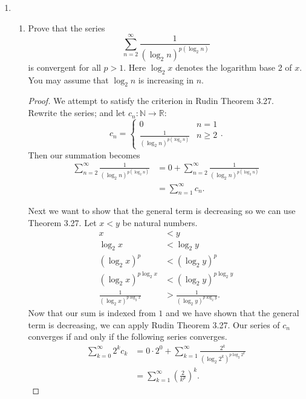\documentclass{article}
\begin{document}
\begin{enumerate} 
\item \begin{enumerate}
        \item Prove that the series $$\sum_{n=2}^\infty\frac1{(\log_2n)^{p(\log_2n)}}$$
        is convergent for all $p>1.$ Here $\log_2x$ denotes the logarithm base 2 of $x.$ You may assume
        that $\log_2n$ is increasing in $n.$

        \begin{proof} 
            We attempt to satisfy the criterion in Rudin Theorem 3.27. Rewrite the series; 
            and let $c_n:\mathbb{N}\to \mathbb{R}$:
            \[
            c_n=\begin{cases}
                0&n=1\\
                \frac1{(\log_2n)^{p(\log_2n)}}&n\ge 2
            \end{cases}
            .\] 
            Then our summation becomes
            \begin{align*}
                \sum_{n=2}^\infty\frac1{(\log_2n)^{p(\log_2n)}}&= 0+\sum_{n=2}^\infty\frac1{(\log_2n)^{p(\log_2n)}} \\
                &= \sum_{n=1}^{\infty} c_n
            .\end{align*}

            Next we want to show that the general term is decreasing so we can use Theorem 3.27. Let $x<y$
            be natural numbers.
            \begin{align*}
                x&<y\\
                \log_2 x&<\log_2 y\\
                (\log_2 x)^{p}&<(\log_2 y)^{p}\\
                (\log_2 x)^{p\log_2 x}&<(\log_2 y)^{p\log_2 y}\\
                \frac{1}{(\log_2 x)^{p\log_2 x}}&>\frac{1}{(\log_2 y)^{p\log_2 y}}
            .\end{align*}
            Now that our sum is indexed from $1$ and we have shown that the general term is decreasing,
            we can apply Rudin Theorem 3.27. Our series of $c_n$ converges if and only if the following 
            series converges.
            \begin{align*}
                \sum_{k=0}^{\infty} 2^kc_k
                &= 0\cdot 2^0+  \sum_{k=1}^{\infty} \frac{2^k}{\left(\log_2 2^k\right)^{p\log_2 2^k}} \\
                &= \sum_{k=1}^{\infty} \left( \frac{2}{k^{p}} \right) ^{k} 
            .\end{align*}   


\end{proof}
\end{enumerate}
\end{enumerate}
\end{document}
